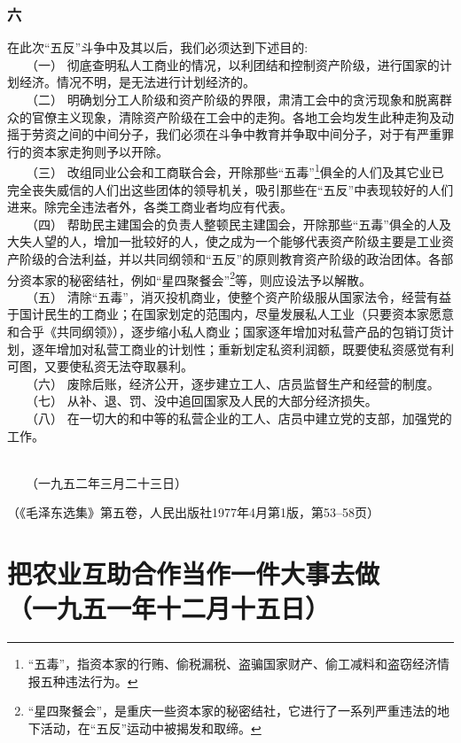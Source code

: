 \documentclass[cn,11pt,chinese]{elegantbook}
\def\myformat#1{\hfil\hfil #1}
\begin{document}
\subsubsection*{\myformat{六}}
在此次“五反”斗争中及其以后，我们必须达到下述目的:\\
　　（一） 彻底查明私人工商业的情况，以利团结和控制资产阶级，进行国家的计划经济。情况不明，是无法进行计划经济的。\\
　　（二） 明确划分工人阶级和资产阶级的界限，肃清工会中的贪污现象和脱离群众的官僚主义现象，清除资产阶级在工会中的走狗。各地工会均发生此种走狗及动摇于劳资之间的中间分子，我们必须在斗争中教育并争取中间分子，对于有严重罪行的资本家走狗则予以开除。\\
　　（三） 改组同业公会和工商联合会，开除那些“五毒”\footnote[1]{“五毒”，指资本家的行贿、偷税漏税、盗骗国家财产、偷工减料和盗窃经济情报五种违法行为。}俱全的人们及其它业已完全丧失威信的人们出这些团体的领导机关，吸引那些在“五反”中表现较好的人们进来。除完全违法者外，各类工商业者均应有代表。\\
　　（四） 帮助民主建国会的负责人整顿民主建国会，开除那些“五毒”俱全的人及大失人望的人，增加一批较好的人，使之成为一个能够代表资产阶级主要是工业资产阶级的合法利益，并以共同纲领和“五反”的原则教育资产阶级的政治团体。各部分资本家的秘密结社，例如“星四聚餐会”\footnote[2]{“星四聚餐会”，是重庆一些资本家的秘密结社，它进行了一系列严重违法的地下活动，在“五反”运动中被揭发和取缔。}等，则应设法予以解散。\\
　　（五） 清除“五毒”，消灭投机商业，使整个资产阶级服从国家法令，经营有益于国计民生的工商业；在国家划定的范围内，尽量发展私人工业（只要资本家愿意和合乎《共同纲领》），逐步缩小私人商业；国家逐年增加对私营产品的包销订货计划，逐年增加对私营工商业的计划性；重新划定私资利润额，既要使私资感觉有利可图，又要使私资无法夺取暴利。\\
　　（六） 废除后账，经济公开，逐步建立工人、店员监督生产和经营的制度。\\
　　（七） 从补、退、罚、没中追回国家及人民的大部分经济损失。\\
　　（八） 在一切大的和中等的私营企业的工人、店员中建立党的支部，加强党的工作。\\
　　\begin{flushright}
　　（一九五二年三月二十三日）
　　\end{flushright}
\begin{flushright}（《毛泽东选集》第五卷，人民出版社1977年4月第1版，第53--58页）\end{flushright}
\newpage\section*{\myformat{把农业互助合作当作一件大事去做}\\\myformat{（一九五一年十二月十五日）}}
\end{document}
